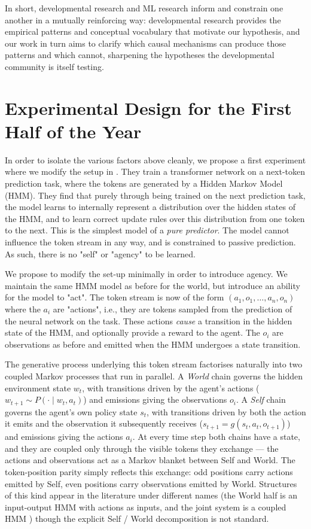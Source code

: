 \documentclass[11pt]{article}
\begin{document}
In short, developmental research and ML research inform and constrain one another in a mutually reinforcing way: developmental research provides the empirical patterns and conceptual vocabulary that motivate our hypothesis, and our work in turn aims to clarify which causal mechanisms can produce those patterns and which cannot, sharpening the hypotheses the developmental community is itself testing.

\section*{Experimental Design for the First Half of the Year}

In order to isolate the various factors above cleanly, we propose a first experiment where we modify the setup in \citep{shai2024belief}. They train a transformer network on a next-token prediction task, where the tokens are generated by a Hidden Markov Model (HMM). They find that purely through being trained on the next prediction task, the model learns to internally represent a distribution over the hidden states of the HMM, and to learn correct update rules over this distribution from one token to the next. This is the simplest model of a \emph{pure predictor}. The model cannot influence the token stream in any way, and is constrained to passive prediction. As such, there is no "self" or "agency" to be learned. 

We propose to modify the set-up minimally in order to introduce agency. We maintain the same HMM model as before for the world, but introduce an ability for the model to "act". The token stream is now of the form $(a_1,o_1,\dots,a_n,o_n)$ where the $a_i$ are "actions", i.e., they are tokens sampled from the prediction of the neural network on the task. These actions \emph{cause} a transition in the hidden state of the HMM, and optionally provide a reward to the agent. The $o_i$ are observations as before and emitted when the HMM undergoes a state transition.

The generative process underlying this token stream factorises naturally into two coupled Markov processes that run in parallel. A \emph{World} chain governs the hidden environment state $w_t$, with transitions driven by the agent's actions ($w_{t+1} \sim P(\cdot \mid w_t, a_t)$) and emissions giving the observations $o_i$. A \emph{Self} chain governs the agent's own policy state $s_t$, with transitions driven by both the action it emits and the observation it subsequently receives ($s_{t+1} = g(s_t, a_t, o_{t+1})$) and emissions giving the actions $a_i$. At every time step both chains have a state, and they are coupled only through the visible tokens they exchange --- the actions and observations act as a Markov blanket between Self and World. The token-position parity simply reflects this exchange: odd positions carry actions emitted by Self, even positions carry observations emitted by World. Structures of this kind appear in the literature under different names (the World half is an input-output HMM \citep{bengio1995iohmm} with actions as inputs, and the joint system is a coupled HMM \citep{brand1996coupled}) though the explicit Self / World decomposition is not standard. 
\end{document}
